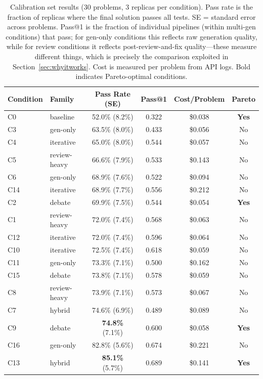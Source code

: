\documentclass{article}
\begin{document}
\begin{table}[t]
\centering
\caption{Calibration set results (30 problems, 3 replicas per condition). Pass rate is the fraction of replicas where the final solution passes all tests. SE = standard error across problems. Pass@1 is the fraction of individual pipelines (within multi-gen conditions) that pass; for gen-only conditions this reflects raw generation quality, while for review conditions it reflects post-review-and-fix quality---these measure different things, which is precisely the comparison exploited in Section~\ref{sec:whyitworks}. Cost is measured per problem from API logs. Bold indicates Pareto-optimal conditions.}
\label{tab:calibration}
\small
\begin{tabular}{llcccc}
\toprule
Condition & Family & Pass Rate (SE) & Pass@1 & Cost/Problem & Pareto \\
\midrule
C0  & baseline     & 52.0\% (8.2\%) & 0.322 & \$0.038 & \textbf{Yes} \\
C3  & gen-only     & 63.5\% (8.0\%) & 0.433 & \$0.056 & No \\
C4  & iterative    & 65.0\% (8.0\%) & 0.544 & \$0.057 & No \\
C5  & review-heavy & 66.6\% (7.9\%) & 0.533 & \$0.143 & No \\
C6  & gen-only     & 68.9\% (7.6\%) & 0.522 & \$0.094 & No \\
C14 & iterative    & 68.9\% (7.7\%) & 0.556 & \$0.212 & No \\
C2  & debate       & 69.9\% (7.5\%) & 0.544 & \$0.054 & \textbf{Yes} \\
C1  & review-heavy & 72.0\% (7.4\%) & 0.568 & \$0.063 & No \\
C12 & iterative    & 72.0\% (7.4\%) & 0.596 & \$0.064 & No \\
C10 & iterative    & 72.5\% (7.4\%) & 0.618 & \$0.059 & No \\
C11 & gen-only     & 73.3\% (7.1\%) & 0.500 & \$0.162 & No \\
C15 & debate       & 73.8\% (7.1\%) & 0.578 & \$0.059 & No \\
C8  & review-heavy & 73.9\% (7.1\%) & 0.573 & \$0.067 & No \\
C7  & hybrid       & 74.6\% (6.9\%) & 0.489 & \$0.089 & No \\
C9  & debate       & \textbf{74.8\%} (7.1\%) & 0.600 & \$0.058 & \textbf{Yes} \\
C16 & gen-only     & 82.8\% (5.6\%) & 0.674 & \$0.221 & No \\
C13 & hybrid       & \textbf{85.1\%} (5.7\%) & 0.689 & \$0.141 & \textbf{Yes} \\
\bottomrule
\end{tabular}
\end{table}
\end{document}
